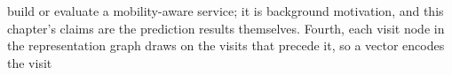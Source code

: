 build or evaluate a mobility-aware service; it is background motivation, and this chapter's claims are the
prediction results themselves.
Fourth, each
visit node in the representation graph draws on the visits that precede it, so a vector encodes the visit
